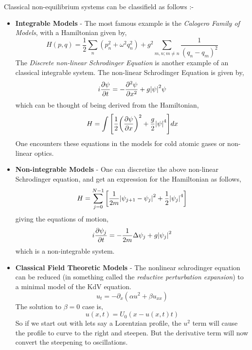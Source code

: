 \documentclass[a4paper,11pt]{article}
\begin{document}
Classical non-equilibrium systems can be classifield as follows :-
\begin{itemize}
	\item \textbf{Integrable Models} - The most famous example is the \textit{Calogero Family of Models}, with a Hamiltonian given by,
	\begin{equation*}
	H(p,q) = \dfrac{1}{2}\sum_{n} (p_n^2 + \omega^2 q_n^2) + g^2 \sum_{m,n ; m \ne n }\dfrac{1}{(q_n - q_m)^2}
	\end{equation*}
	The \textit{Discrete non-linear Schrodinger Equation} is another example of an classical integrable system. The non-linear Schrodinger Equation is given by,
	\begin{equation*}
	i \pdv{\psi}{t} = - \pdv[2]{\psi}{x} + g \abs{\psi }^2 \psi
	\end{equation*}
	which can be thought of being derived from the Hamiltonian,
	\begin{equation*}
	H = \int \qty[\dfrac{1}{2} \qty(\pdv{\psi}{x})^2 + \dfrac{g}{2} \abs{\psi}^4] dx
	\end{equation*}
	One encounters these equations in the models for cold atomic gases or non-linear optics.
	\item \textbf{Non-integrable Models} - One can discretize the above non-linear Schrodinger equation, and get an expression for the Hamiltonian as follows,
	\begin{equation*}
	H = \sum_{j=0}^{N-1} \qty[\dfrac{1}{2m} \abs{\psi_{j+1} - \psi_j}^2 + \dfrac{1}{2} \abs{\psi_{j}}^4]
	\end{equation*}
	giving the equations of motion,
	\begin{align*}
	i \pdv{\psi_j}{t} = -\dfrac{1}{2m } \Delta \psi_j + g \abs{\psi_j}^2
	\end{align*}
	which is a non-integrable system.
	
	\item \textbf{Classical Field Theoretic Models} - The nonlinear schrodinger equation can be reduced (in something called the \textit{reductive perturbation expansion}) to a minimal model of the KdV equation. 
	\begin{equation*}
	u_t = -\partial_x (\alpha u^2 + \beta u_{xx}) 
	\end{equation*} The solution to $ \beta=0 $ case is,
	\begin{equation*}
	u(x,t) = U_0(x - u(x,t) t)
	\end{equation*}
	 So if we start out with lets say a Lorentzian profile, the $ u^2  $ term will cause the profile to curve to the right and steepen. But the derivative term will now convert the steepening to oscillations.
\end{itemize}
\end{document}
